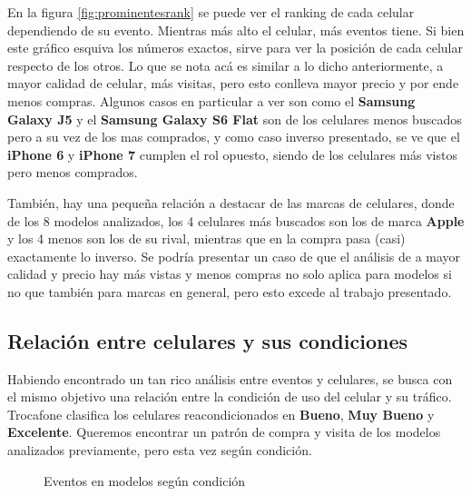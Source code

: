 \documentclass[a4paper]{article}
\begin{document}
En la figura \ref{fig:prominentesrank} se puede ver el ranking de cada celular dependiendo de su evento. Mientras más alto el celular, más eventos tiene. Si bien este gráfico esquiva los números exactos, sirve para ver la posición de cada celular respecto de los otros. Lo que se nota acá es similar a lo dicho anteriormente, a mayor calidad de celular, más visitas, pero esto conlleva mayor precio y por ende menos compras. Algunos casos en particular a ver son como el \textbf{Samsung Galaxy J5} y el \textbf{Samsung Galaxy S6 Flat} son de los celulares menos buscados pero a su vez de los mas comprados, y como caso inverso presentado, se ve que el \textbf{iPhone 6} y \textbf{iPhone 7} cumplen el rol opuesto, siendo de los celulares más vistos pero menos comprados.

También, hay una pequeña relación a destacar de las marcas de celulares, donde de los 8 modelos analizados, los 4 celulares más buscados son los de marca \textbf{Apple} y los 4 menos son los de su rival, mientras que en la compra pasa (casi) exactamente lo inverso. Se podría presentar un caso de que el análisis de a mayor calidad y precio hay más vistas y menos compras no solo aplica para modelos si no que también para marcas en general, pero esto excede al trabajo presentado.

\subsection{Relación entre celulares y sus condiciones}

Habiendo encontrado un tan rico análisis entre eventos y celulares, se busca con el mismo objetivo una relación entre la condición de uso del celular y su tráfico. Trocafone clasifica los celulares reacondicionados en \textbf{Bueno}, \textbf{Muy Bueno} y \textbf{Excelente}. Queremos encontrar un patrón de compra y visita de los modelos analizados previamente, pero esta vez según condición.

\begin{figure}[h!]
	\caption{Eventos en modelos según condición}
	\label{fig:prominentescondicion}
\end{figure}
\end{document}
